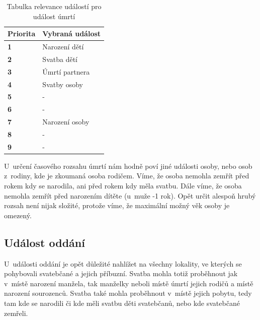 \begin{table}[!ht]
	\centering
	\begin{tabular}{ll}
		\hline
		\textbf{Priorita} & \textbf{Vybraná událost} \\ \hline
		\rowcolor{tableGreen}
		\textbf{1} & Narození dětí \\ 
		\rowcolor{tableGreen}
		\textbf{2} & Svatba dětí \\ 
		\rowcolor{tableGreen}
		\textbf{3} & Úmrtí partnera \\ 
		\rowcolor{tableOrange}
		\textbf{4} & Svatby osoby \\ 
		\rowcolor{tableOrange}
		\textbf{5} & - \\ 
		\rowcolor{tableOrange}
		\textbf{6} & - \\ 
		\rowcolor{tableRed}
		\textbf{7} & Narození osoby \\ 
		\rowcolor{tableRed}
		\textbf{8} & - \\ 
		\rowcolor{tableRed}
		\textbf{9} & - \\ \hline
	\end{tabular}
	\caption{Tabulka relevance událostí pro událost úmrtí}
\end{table}

U~určení časového rozsahu úmrtí nám hodně poví jiné události osoby, nebo osob z~rodiny, kde je zkoumaná osoba rodičem. Víme, že osoba nemohla zemřít před rokem kdy se narodila, ani před rokem kdy měla svatbu. Dále víme, že osoba nemohla zemřít před narozením dítěte (u~muže -1 rok). Opět určit alespoň hrubý rozsah není nijak složité, protože víme, že maximální možný věk osoby je omezený.


\subsection{Událost oddání}
U~události oddání je opět důležité nahlížet na všechny lokality, ve kterých se pohybovali svatebčané a jejich příbuzní. Svatba mohla totiž proběhnout jak v~místě narození manžela, tak manželky neboli místě úmrtí jejich rodičů a místě narození sourozenců. Svatba také mohla proběhnout v~místě jejich pobytu, tedy tam kde se narodili či kde měli svatbu děti svatebčanů, nebo kde svatebčané zemřeli.

